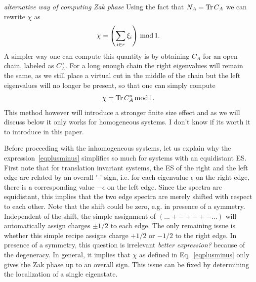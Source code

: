 \documentclass[twocolumn,amsmath,longbibliography,amssymb,superscriptaddress]{revtex4-1}
\newcommand{\carlos}[1]{{\color{red} #1}}
\newcommand{\mariac}[1]{{\it\color{cyan}#1}}
\begin{document}
\mariac{alternative way of computing Zak phase}
Using the fact that $N_A = \Tr C_A$ we can rewrite $\chi$ as
\begin{equation}
\chi = \left(\sum_{i\in r} \xi_i\right) \, {\rm mod} \, 1.
\end{equation}
A simpler way one can compute this quantity is by obtaining $C_A$ for an open chain, labeled as $C_A^{ o}$. For a long enough chain the right eigenvalues will remain the same, as we still place a virtual cut in the middle of the chain but the left eigenvalues will no longer be present, so that one can simply compute
\begin{equation}
\chi = \Tr C_A^{o} \, {\rm mod} \, 1.
\end{equation}
This method however will introduce a stronger finite size effect and as we will discuss below it only works for homogeneous systems. \carlos{I don't know if its worth it to introduce in this paper. }

Before proceeding with the inhomogeneous systems, let us explain why the expression~\eqref{eqplusminus} simplifies so much for systems with an equidistant ES. 
First note that for translation invariant systems, the ES of the right and the left edge are related by an overall '-' sign, i.e. for each eigenvalue $\epsilon$ on the right edge, there is a corresponding value $-\epsilon$ on the left edge. 
Since the spectra are equidistant, this implies that the two edge spectra are merely shifted with respect to each other.
Note that  the shift could be zero, e.g.  in presence of a symmetry. 
Independent of the shift, the simple assignment of $ (...+-+-+-...)$ will automatically assign charges $\pm 1/2$ to each edge. 
The only remaining issue is whether this simple recipe assigns charge $+1/2$ or $-1/2$ to the right edge.
In presence of a symmetry, this question is irrelevant \mariac{better expression?} because of the degeneracy. 
In general, it implies that $\chi$ as defined in Eq.~\eqref{eqplusminus} only gives the Zak phase up to an overall sign. 
This issue can be fixed by determining the localization of a single eigenstate. 

\end{document}
